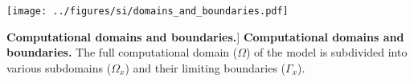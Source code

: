 \begin{figure*}[!b]
\centering
\texttt{[image: ../figures/si/domains\_and\_boundaries.pdf]}
\caption
[\textbf{Computational domains and boundaries.}]
{
\textbf{Computational domains and boundaries.}
The full computational domain ($\Omega$) of the model is subdivided into various subdomains ($\Omega_x$) and
their limiting boundaries ($\Gamma_x$).
}

\label{fig:domains_an_boundaries}

\end{figure*}
